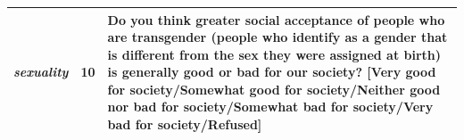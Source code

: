 \begin{table}[!h]
\begin{center}
\begin{small}
\begin{tabular}{p{4.5cm}rp{10.5cm}}
            \textit{sexuality} &   10 &  Do you think greater social acceptance of people who are transgender (people who identify as a gender that is different from the sex they were assigned at birth) is generally good or bad for our society? [Very good for society/Somewhat good for society/Neither good nor bad for society/Somewhat bad for society/Very bad for society/Refused]\\ 
            \bottomrule
            \end{tabular}
    \end{small}
 \end{center}    
 \vskip -0.1in
 \end{table}

 \begin{table}[!h]
    \ContinuedFloat

    \caption{Topic breakdown of questions in \bname{}; high-level topics are in bold and sub-categories are italicized. Note: a questions can belong to multiple topics. }    \vskip 0.15in
    \renewcommand{\arraystretch}{1.5}
    \begin{center}
    \begin{small}


\end{small}
\end{center}
\end{table}
